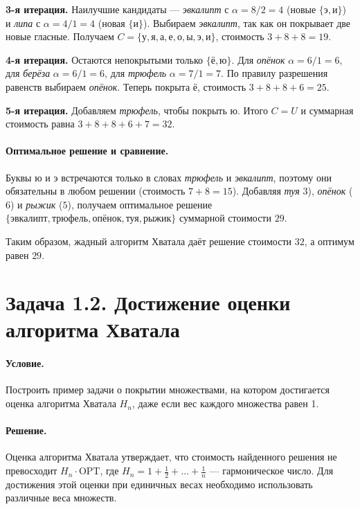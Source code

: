 \documentclass[12pt]{article}
\begin{document}
  \textbf{3-я итерация.} Наилучшие кандидаты — \emph{эвкалипт} с \(\alpha=8/2=4\) (новые \(\{\text{э},\text{и}\}\)) и \emph{липа} с \(\alpha=4/1=4\) (новая \(\{\text{и}\}\)). Выбираем \emph{эвкалипт}, так как он покрывает две новые гласные. Получаем \(C=\{\text{у},\text{я},\text{а},\text{е},\text{о},\text{ы},\text{э},\text{и}\}\), стоимость \(3+8+8=19\).

  \textbf{4-я итерация.} Остаются непокрытыми только \(\{\text{ё},\text{ю}\}\). Для \emph{опёнок} \(\alpha=6/1=6\), для \emph{берёза} \(\alpha=6/1=6\), для \emph{трюфель} \(\alpha=7/1=7\). По правилу разрешения равенств выбираем \emph{опёнок}. Теперь покрыта \(\text{ё}\), стоимость \(3+8+8+6=25\).

  \textbf{5-я итерация.} Добавляем \emph{трюфель}, чтобы покрыть \(\text{ю}\). Итого \(C=U\) и суммарная стоимость равна \(3+8+8+6+7=32\).




  \paragraph{Оптимальное решение и сравнение.}
  Буквы \(\text{ю}\) и \(\text{э}\) встречаются только в словах \emph{трюфель} и \emph{эвкалипт}, поэтому они обязательны в любом решении (стоимость \(7+8=15\)). Добавляя \emph{туя}  \(3\)), \emph{опёнок} (\(6\)) и \emph{рыжик} (\(5\)), получаем оптимальное решение \(\{\text{эвкалипт},\text{трюфель},\text{опёнок},\text{туя},\text{рыжик}\}\) суммарной стоимости \(29\).

  Таким образом, жадный алгоритм Хватала даёт решение стоимости \(32\), а оптимум равен \(29\).

  \section*{Задача 1.2. Достижение оценки алгоритма Хватала}

  \paragraph{Условие.}
  Построить пример задачи о покрытии множествами, на котором достигается оценка алгоритма Хватала \(H_n\), даже если вес каждого множества равен 1.

  \paragraph{Решение.}
  Оценка алгоритма Хватала утверждает, что стоимость найденного решения не превосходит \(H_n \cdot \text{OPT}\), где \(H_n = 1 + \frac{1}{2} + \ldots + \frac{1}{n}\) — гармоническое число. Для достижения этой оценки при единичных весах необходимо использовать различные веса множеств.
\end{document}
